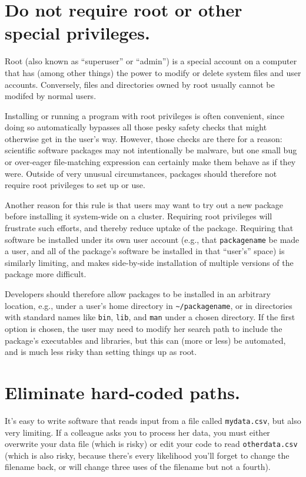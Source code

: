 \documentclass[10pt]{article}
\begin{document}
\section{Do not require root or other special privileges.}

Root (also known as ``superuser'' or ``admin'') is a special account on
a computer that has (among other things) the power to modify or delete
system files and user accounts. Conversely, files and directories owned
by root usually cannot be modifed by normal users.

Installing or running a program with root privileges is often
convenient, since doing so automatically bypasses all those pesky safety
checks that might otherwise get in the user's way. However, those checks
are there for a reason: scientific software packages may not
intentionally be malware, but one small bug or over-eager file-matching
expression can certainly make them behave as if they were. Outside of
very unusual circumstances, packages should therefore not require root
privileges to set up or use.

Another reason for this rule is that users may want to try out a new
package before installing it system-wide on a cluster. Requiring root
privileges will frustrate such efforts, and thereby reduce uptake of the
package. Requiring that software be installed under its own user account
(e.g., that \texttt{packagename} be made a user, and all of the
package's software be installed in that ``user's'' space) is similarly
limiting, and makes side-by-side installation of multiple versions of
the package more difficult.

Developers should therefore allow packages to be installed in an
arbitrary location, e.g., under a user's home directory in
\texttt{\textasciitilde{}/packagename}, or in directories with standard
names like \texttt{bin}, \texttt{lib}, and \texttt{man} under a chosen
directory. If the first option is chosen, the user may need to modify
her search path to include the package's executables and libraries, but
this can (more or less) be automated, and is much less risky than
setting things up as root.

\section{Eliminate hard-coded paths.}

It's easy to write software that reads input from a file called
\texttt{mydata.csv}, but also very limiting. If a colleague asks you to
process her data, you must either overwrite your data file (which is
risky) or edit your code to read \texttt{otherdata.csv} (which is also
risky, because there's every likelihood you'll forget to change the
filename back, or will change three uses of the filename but not a
fourth).
\end{document}
